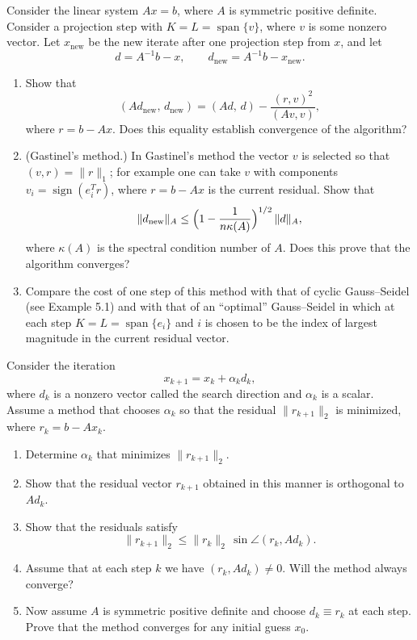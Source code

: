 \documentclass{ctexart}
\begin{document}
  \begin{problem}
Consider the linear system \(Ax=b\), where \(A\) is symmetric positive definite.  
Consider a projection step with \(K=L=\operatorname{span}\{v\}\), where \(v\) is some nonzero vector.  
Let \(x_{\text{new}}\) be the new iterate after one projection step from \(x\), and let
\[
d = A^{-1}b - x,\qquad d_{\text{new}} = A^{-1}b - x_{\text{new}}.
\]

\begin{enumerate}[label=(\alph*)]
  \item Show that
  \[
    (A d_{\text{new}},\, d_{\text{new}})
    = (A d,\, d) - \frac{(r, v)^2}{(A v, v)},
  \]
  where \(r=b-Ax\). Does this equality establish convergence of the algorithm?
  
  \item (Gastinel's method.) In Gastinel's method the vector \(v\) is selected so that
  \((v,r)=\|r\|_1\); for example one can take \(v\) with components \(v_i=\operatorname{sign}(e_i^T r)\),
  where \(r=b-Ax\) is the current residual. Show that
  \[
    \|d_{\text{new}}\|_A \le \Bigl(1-\frac{1}{n\kappa(A)}\Bigr)^{1/2}\,\|d\|_A,
  \]
  where \(\kappa(A)\) is the spectral condition number of \(A\). Does this prove that the algorithm converges?
  
  \item Compare the cost of one step of this method with that of cyclic Gauss--Seidel (see Example 5.1)
  and with that of an “optimal” Gauss--Seidel in which at each step \(K=L=\operatorname{span}\{e_i\}\)
  and \(i\) is chosen to be the index of largest magnitude in the current residual vector.
\end{enumerate}
\end{problem}


\begin{problem}
Consider the iteration
\[
x_{k+1} = x_k + \alpha_k d_k,
\]
where \(d_k\) is a nonzero vector called the search direction and \(\alpha_k\) is a scalar.  
Assume a method that chooses \(\alpha_k\) so that the residual \(\|r_{k+1}\|_2\) is minimized, where \(r_k=b-Ax_k\).

\begin{enumerate}[label=(\alph*)]
  \item Determine \(\alpha_k\) that minimizes \(\|r_{k+1}\|_2\).
  
  \item Show that the residual vector \(r_{k+1}\) obtained in this manner is orthogonal to \(A d_k\).
  
  \item Show that the residuals satisfy
  \[
    \|r_{k+1}\|_2 \le \|r_k\|_2 \,\sin\angle(r_k, A d_k).
  \]
  
  \item Assume that at each step \(k\) we have \((r_k, A d_k)\neq 0\). Will the method always converge?
  
  \item Now assume \(A\) is symmetric positive definite and choose \(d_k \equiv r_k\) at each step. Prove that the method converges for any initial guess \(x_0\).
\end{enumerate}
\end{problem}
\end{document}
